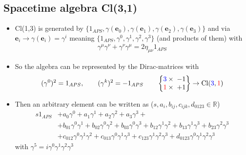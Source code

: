\documentclass[../main.tex]{subfiles}
\begin{document}
\begin{itemize}
\subsection{Spacetime algebra Cl(3,1)}
\begin{itemize}
\item Cl(1,3) is generated by $\{1_{APS},\gamma(\mathbf{e}_0),\gamma(\mathbf{e}_1),\gamma(\mathbf{e}_2),\gamma(\mathbf{e}_3)\}$ and via $\mathbf{e}_i\rightarrow\gamma(\mathbf{e}_i)=\gamma^i$ meaning $\{1_{APS},\gamma^0,\gamma^1,\gamma^2,\gamma^3\}$ (and products of them) with
\begin{align}
\gamma^\mu\gamma^\nu+\gamma^\nu\gamma^\mu=2\eta_{\mu\nu}1_{APS}
\end{align}
\item So the algebra can be represented by the Dirac-matrices with 
\begin{align}
(\gamma^0)^2=1_{APS},\qquad(\gamma^k)^2=-1_{APS}\qquad\left\{\begin{matrix}
\textcolor{blue}{3}\times\;-1\\
\textcolor{red}{1}\times\;+1\\
\end{matrix}\right\}\rightarrow\text{Cl}(\textcolor{blue}{3},\textcolor{red}{1})
\end{align}
\item Then an arbitrary element can be written as ($s,a_i,b_{ij},c_{ijk},d_{0123}\in\mathbb{R}$)
\begin{align}
s1_{APS}&
+a_0\gamma^0
+a_1\gamma^1
+a_2\gamma^2
+a_3\gamma^3+\\
&+b_{01}\gamma^0\gamma^1
+b_{02}\gamma^0\gamma^2
+b_{03}\gamma^0\gamma^3
+b_{12}\gamma^1\gamma^2
+b_{13}\gamma^1\gamma^3
+b_{23}\gamma^2\gamma^3\\
&+c_{012}\gamma^0\gamma^1\gamma^2
+c_{013}\gamma^0\gamma^1\gamma^3
+c_{123}\gamma^1\gamma^2\gamma^3
+d_{0123}\gamma^0\gamma^1\gamma^2\gamma^3
\end{align}
with $\gamma^5=i\gamma^0\gamma^1\gamma^2\gamma^3$


\end{itemize}
\end{itemize}
\end{document}
